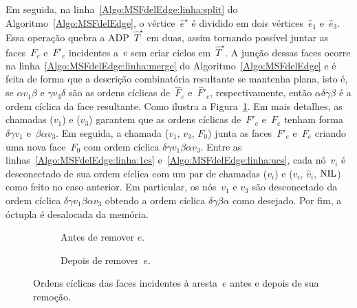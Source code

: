 Em seguida, na linha~\ref{Algo:MSFdelEdge:linha:split} do Algoritmo~\ref{Algo:MSFdelEdge}, o vértice~$\hat e^\star$ é dividido em dois vértices~$\hat e_1$ e~$\hat e_3$. 
Essa operação quebra a ADP~$\hat T^\star$ em duas, assim tornando possível juntar as faces~$F_e$ e~$F'_e$ incidentes a~$e$ sem criar ciclos em~$\hat T^\star$.
A junção dessas faces ocorre na linha~\ref{Algo:MSFdelEdge:linha:merge} do Algoritmo~\ref{Algo:MSFdelEdge} e é feita de forma que a descrição combinatória resultante se mantenha plana, isto é, se $\alpha v_1 \beta$ e $\gamma v_3 \delta$ são as ordens cíclicas de~$\hat F_e$ e~$\hat F'_e$, respectivamente, então $\alpha \delta\gamma\beta$ é a ordem cíclica da face resultante.
Como ilustra a Figura~\ref{fig:MSF-ordem-ciclica-nao-ponte}.
Em mais detalhes, as chamadas \LCOCycle($v_1$) e \LCOCycle($v_3$) garantem que as ordens cíclicas de~$F'_e$ e~$F_e$ tenham forma~$\delta\gamma v_1$ e~$\beta\alpha v_3$.
Em seguida, a chamada \LCOMerge($v_1$, $v_3$, $F_0$) junta as faces~$F'_e$ e~$F_e$ criando uma nova face~$F_0$ com ordem cíclica $\delta\gamma v_1\beta\alpha v_3$.
Entre as linhas~\ref{Algo:MSFdelEdge:linha:1cs} e~\ref{Algo:MSFdelEdge:linha:ucs}, cada nó~$v_i$ é desconectado de sua ordem cíclica com um par de chamadas \LCOCycle($v_i$) e \LCOSplit($v_i$, $\hat v_i$, $\text{NIL}$) como feito no caso anterior.
Em particular, os nós~$v_1$ e $v_3$ são desconectado da ordem cíclica $\delta\gamma v_1\beta\alpha v_3$ obtendo a ordem cíclica $\delta\gamma\beta\alpha$ como desejado.
Por fim, a óctupla é desalocada da memória.


\begin{figure}[h!]
\begin{subfigure}{.4\textwidth}

\caption{Antes de remover $e$.}
\label{fig:MSF-ordem-ciclica-nao-ponte}
\end{subfigure}
\hfill
\begin{subfigure}{.4\textwidth}

\caption{Depois de remover~$e$.}
\label{fig:MSF-ordem-ciclica-nao-ponte-depois}
\end{subfigure}
\caption{Ordens cíclicas das faces incidentes à aresta~$e$ antes e depois de sua remoção.}
\end{figure}

